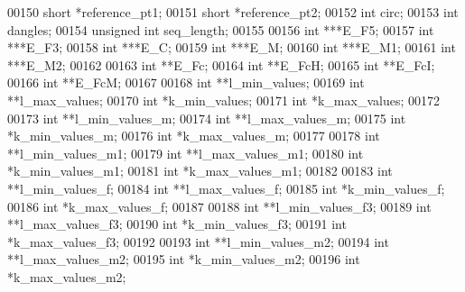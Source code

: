\begin{DoxyCode}
00150   \textcolor{keywordtype}{short}           *reference\_pt1;
00151   \textcolor{keywordtype}{short}           *reference\_pt2;
00152   \textcolor{keywordtype}{int}             circ;
00153   \textcolor{keywordtype}{int}             dangles;
00154   \textcolor{keywordtype}{unsigned} \textcolor{keywordtype}{int}    seq\_length;
00155 
00156   \textcolor{keywordtype}{int}             ***E\_F5;
00157   \textcolor{keywordtype}{int}             ***E\_F3;
00158   \textcolor{keywordtype}{int}             ***E\_C;
00159   \textcolor{keywordtype}{int}             ***E\_M;
00160   \textcolor{keywordtype}{int}             ***E\_M1;
00161   \textcolor{keywordtype}{int}             ***E\_M2;
00162 
00163   \textcolor{keywordtype}{int}             **E\_Fc;
00164   \textcolor{keywordtype}{int}             **E\_FcH;
00165   \textcolor{keywordtype}{int}             **E\_FcI;
00166   \textcolor{keywordtype}{int}             **E\_FcM;
00167 
00168   \textcolor{keywordtype}{int}             **l\_min\_values;
00169   \textcolor{keywordtype}{int}             **l\_max\_values;
00170   \textcolor{keywordtype}{int}             *k\_min\_values;
00171   \textcolor{keywordtype}{int}             *k\_max\_values;
00172 
00173   \textcolor{keywordtype}{int}             **l\_min\_values\_m;
00174   \textcolor{keywordtype}{int}             **l\_max\_values\_m;
00175   \textcolor{keywordtype}{int}             *k\_min\_values\_m;
00176   \textcolor{keywordtype}{int}             *k\_max\_values\_m;
00177 
00178   \textcolor{keywordtype}{int}             **l\_min\_values\_m1;
00179   \textcolor{keywordtype}{int}             **l\_max\_values\_m1;
00180   \textcolor{keywordtype}{int}             *k\_min\_values\_m1;
00181   \textcolor{keywordtype}{int}             *k\_max\_values\_m1;
00182 
00183   \textcolor{keywordtype}{int}             **l\_min\_values\_f;
00184   \textcolor{keywordtype}{int}             **l\_max\_values\_f;
00185   \textcolor{keywordtype}{int}             *k\_min\_values\_f;
00186   \textcolor{keywordtype}{int}             *k\_max\_values\_f;
00187 
00188   \textcolor{keywordtype}{int}             **l\_min\_values\_f3;
00189   \textcolor{keywordtype}{int}             **l\_max\_values\_f3;
00190   \textcolor{keywordtype}{int}             *k\_min\_values\_f3;
00191   \textcolor{keywordtype}{int}             *k\_max\_values\_f3;
00192 
00193   \textcolor{keywordtype}{int}             **l\_min\_values\_m2;
00194   \textcolor{keywordtype}{int}             **l\_max\_values\_m2;
00195   \textcolor{keywordtype}{int}             *k\_min\_values\_m2;
00196   \textcolor{keywordtype}{int}             *k\_max\_values\_m2;

\end{DoxyCode}

